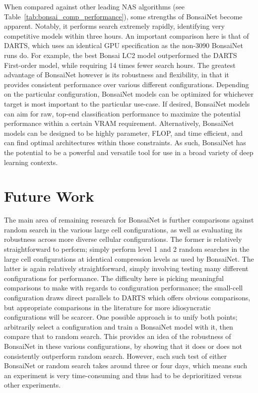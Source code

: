 When compared against other leading NAS algorithms (see Table~\ref{tab:bonsai_comp_performance}),
some strengths of BonsaiNet become apparent. Notably, it performs
search extremely rapidly, identifying very competitive models within three hours. An important comparison here is that of
DARTS, which uses an identical GPU specification as the non-3090 BonsaiNet runs do. For example, the best Bonsai LC2 model
outperformed the DARTS First-order model, while requiring 14 times fewer search hours. The greatest advantage of BonsaiNet
however is its robustness and flexibility, in that it provides consistent
performance over various different configurations. Depending on the particular configuration, BonsaiNet models can
be optimized for whichever target is most important to the particular use-case. If desired, BonsaiNet models can aim
for raw, top-end classification performance to maximize the potential performance within a certain VRAM requirement.
Alternatively, BonsaiNet models can be designed to be highly parameter, FLOP, and time efficient, and can find optimal
architectures within those constraints. As such, BonsaiNet has the potential to be a powerful and versatile tool for use in
a broad variety of deep learning contexts.

\section{Future Work}
The main area of remaining research for BonsaiNet is further comparisons against random search in the various large
cell configurations, as well as evaluating its robustness across more diverse cellular configurations. The former
is relatively straightforward to perform; simply perform level 1 and 2 random searches in the large cell configurations
at identical compression levels as used by BonsaiNet. The latter is again relatively straightforward, simply involving
testing many different configurations for performance. The difficulty here is picking meaningful comparisons to make
with regards to configuration performance; the small-cell configuration draws direct parallels to DARTS which offers obvious
comparisons, but appropriate comparisons in the literature for more idiosyncratic configurations will be scarcer. One possible
approach is to unify both points; arbitrarily select a configuration and train a BonsaiNet model with it, then compare that to
random search. This provides an idea of the robustness of BonsaiNet in these various configurations, by showing that it
does or does not consistently outperform random search. However, each such test of either BonsaiNet or random search
takes around three or four days, which means such an experiment is very time-consuming and thus had to be deprioritized versus
other experiments.

